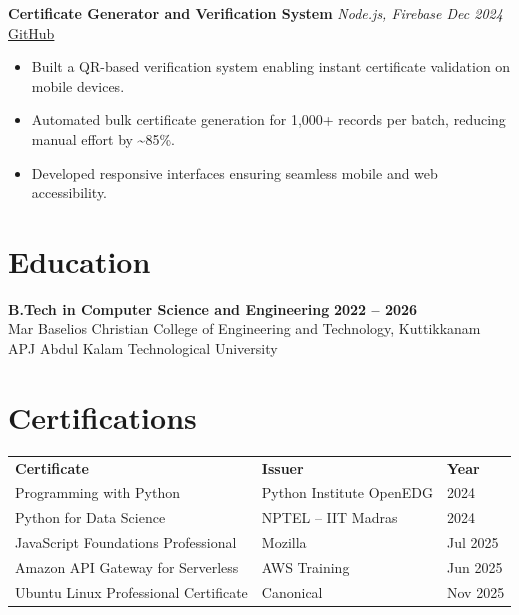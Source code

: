\documentclass[a4paper,10pt]{article}
\begin{document}
\vspace{4pt}

\textbf{Certificate Generator and Verification System} \hfill \textit{Node.js, Firebase \quad Dec 2024} \quad \href{https://github.com/your-github/advanced-certificate-generator}{GitHub}
\begin{itemize}
\item Built a QR-based verification system enabling instant certificate validation on mobile devices.
\item Automated bulk certificate generation for 1,000+ records per batch, reducing manual effort by \textasciitilde{}85\%.
\item Developed responsive interfaces ensuring seamless mobile and web accessibility.
\end{itemize}

\section*{Education}

\textbf{B.Tech in Computer Science and Engineering} \hfill \textbf{2022 -- 2026}\\
Mar Baselios Christian College of Engineering and Technology, Kuttikkanam \hfill APJ Abdul Kalam Technological University

\section*{Certifications}

\renewcommand{\arraystretch}{1.05}
\begin{tabular}{@{} p{7.8cm} p{6.5cm} p{2.5cm} @{}}
\textbf{Certificate}                  & \textbf{Issuer}              & \textbf{Year} \\[1pt]
Programming with Python               & Python Institute OpenEDG   & 2024 \\
Python for Data Science               & NPTEL -- IIT Madras          & 2024 \\
JavaScript Foundations Professional   & Mozilla                      & Jul 2025 \\
Amazon API Gateway for Serverless     & AWS Training                 & Jun 2025 \\
Ubuntu Linux Professional Certificate & Canonical                    & Nov 2025 \\
\end{tabular}
\end{document}
